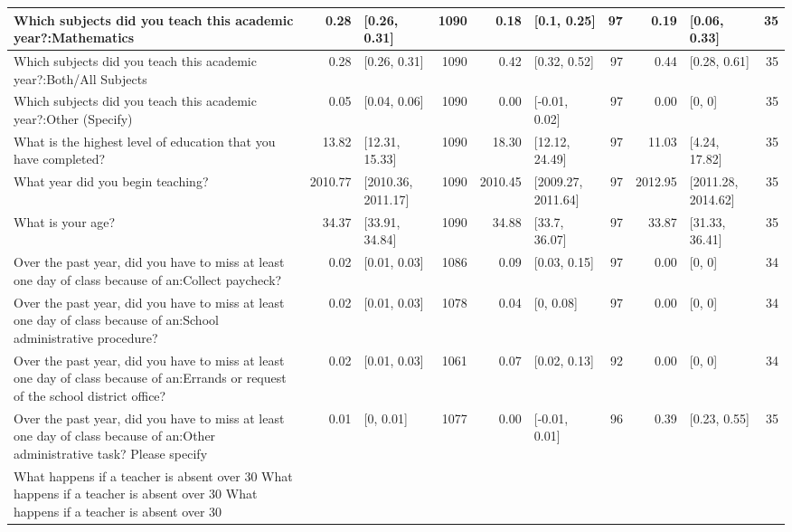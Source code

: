 \documentclass[
]{article}
\begin{document}
\begin{table}
\begin{tabular}[t]{l|r|l|r|r|l|r|r|l|r}
\hline
Which subjects did you teach this academic year?:Mathematics & 0.28 & [0.26, 0.31] & 1090 & 0.18 & [0.1, 0.25] & 97 & 0.19 & [0.06, 0.33] & 35\\
\hline
Which subjects did you teach this academic year?:Both/All Subjects & 0.28 & [0.26, 0.31] & 1090 & 0.42 & [0.32, 0.52] & 97 & 0.44 & [0.28, 0.61] & 35\\
\hline
Which subjects did you teach this academic year?:Other (Specify) & 0.05 & [0.04, 0.06] & 1090 & 0.00 & [-0.01, 0.02] & 97 & 0.00 & [0, 0] & 35\\
\hline
What is the highest level of education that you have completed? & 13.82 & [12.31, 15.33] & 1090 & 18.30 & [12.12, 24.49] & 97 & 11.03 & [4.24, 17.82] & 35\\
\hline
What year did you begin teaching? & 2010.77 & [2010.36, 2011.17] & 1090 & 2010.45 & [2009.27, 2011.64] & 97 & 2012.95 & [2011.28, 2014.62] & 35\\
\hline
What is your age? & 34.37 & [33.91, 34.84] & 1090 & 34.88 & [33.7, 36.07] & 97 & 33.87 & [31.33, 36.41] & 35\\
\hline
Over the past year, did you have to miss at least one day of class because of an:Collect paycheck? & 0.02 & [0.01, 0.03] & 1086 & 0.09 & [0.03, 0.15] & 97 & 0.00 & [0, 0] & 34\\
\hline
Over the past year, did you have to miss at least one day of class because of an:School administrative procedure? & 0.02 & [0.01, 0.03] & 1078 & 0.04 & [0, 0.08] & 97 & 0.00 & [0, 0] & 34\\
\hline
Over the past year, did you have to miss at least one day of class because of an:Errands or request of the school district office? & 0.02 & [0.01, 0.03] & 1061 & 0.07 & [0.02, 0.13] & 92 & 0.00 & [0, 0] & 34\\
\hline
Over the past year, did you have to miss at least one day of class because of an:Other administrative task? Please specify & 0.01 & [0, 0.01] & 1077 & 0.00 & [-0.01, 0.01] & 96 & 0.39 & [0.23, 0.55] & 35\\
\hline
What happens if a teacher is absent over 30%
\hline
What happens if a teacher is absent over 30%
\hline
What happens if a teacher is absent over 30%

\end{tabular}
\end{table}
\end{document}
